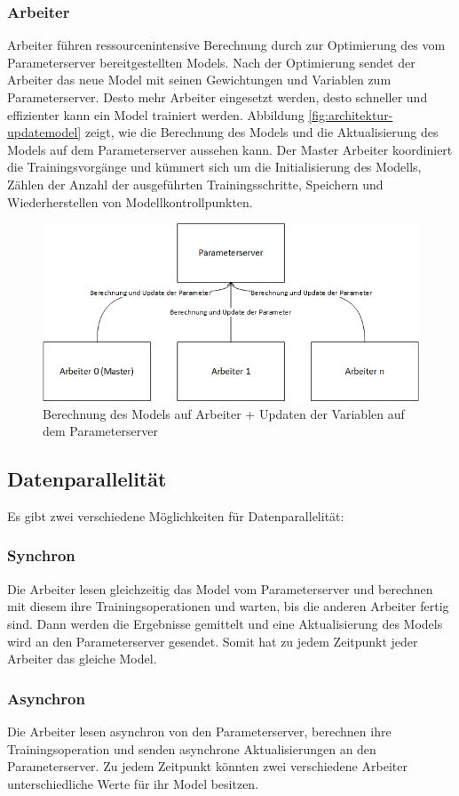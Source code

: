 \subsubsection{Arbeiter}
Arbeiter führen ressourcenintensive Berechnung durch zur Optimierung des vom Parameterserver bereitgestellten Models. Nach der Optimierung sendet der Arbeiter das neue Model mit seinen Gewichtungen und Variablen zum Parameterserver. Desto mehr Arbeiter eingesetzt werden, desto schneller und effizienter kann ein Model trainiert werden. Abbildung \ref{fig:architektur-updatemodel} zeigt, wie die Berechnung des Models und die Aktualisierung des Models auf dem Parameterserver aussehen kann. Der Master Arbeiter koordiniert die Trainingsvorgänge und kümmert sich um die Initialisierung des Modells, Zählen der Anzahl der ausgeführten Trainingsschritte, Speichern und Wiederherstellen von Modellkontrollpunkten.

\begin{figure}[h!]
	\centering
	\includegraphics[width=0.9\linewidth]{Pictures/Architektur-UpdateModel}
	\caption[Berechnung des Models auf Arbeiter + Updaten der Variablen auf dem Parameterserver]{Berechnung des Models auf Arbeiter + Updaten der Variablen auf dem Parameterserver}
	\label{fig:architektur-servemodel}
\end{figure}

\subsection{Datenparallelität}
Es gibt zwei verschiedene Möglichkeiten für Datenparallelität:
\subsubsection{Synchron}
Die Arbeiter lesen gleichzeitig das Model vom Parameterserver und berechnen mit diesem ihre Trainingsoperationen und warten, bis die anderen Arbeiter fertig sind. Dann werden die Ergebnisse gemittelt und eine Aktualisierung des Models wird an den Parameterserver gesendet. Somit hat zu jedem Zeitpunkt jeder Arbeiter das gleiche Model.

\subsubsection{Asynchron}
Die Arbeiter lesen asynchron von den Parameterserver, berechnen ihre Trainingsoperation und senden asynchrone Aktualisierungen an den Parameterserver. Zu jedem Zeitpunkt könnten zwei verschiedene Arbeiter unterschiedliche Werte für ihr Model besitzen.




